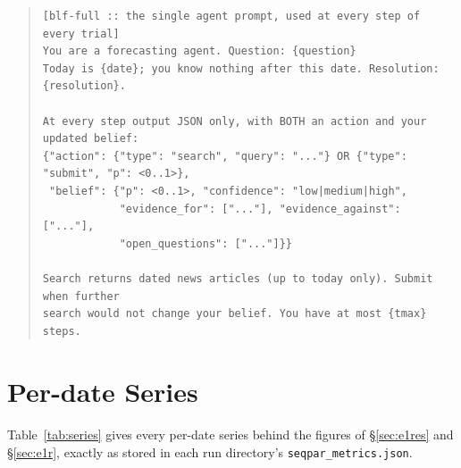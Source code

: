 \documentclass[10pt]{article}
\begin{document}
\begin{quote}
\begin{verbatim}
[blf-full :: the single agent prompt, used at every step of every trial]
You are a forecasting agent. Question: {question}
Today is {date}; you know nothing after this date. Resolution: {resolution}.

At every step output JSON only, with BOTH an action and your updated belief:
{"action": {"type": "search", "query": "..."} OR {"type": "submit", "p": <0..1>},
 "belief": {"p": <0..1>, "confidence": "low|medium|high",
            "evidence_for": ["..."], "evidence_against": ["..."],
            "open_questions": ["..."]}}

Search returns dated news articles (up to today only). Submit when further
search would not change your belief. You have at most {tmax} steps.
\end{verbatim}\end{quote}

\section{Per-date Series}\label{app:series}
Table~\ref{tab:series} gives every per-date series behind the figures of
\S\ref{sec:e1res} and \S\ref{sec:e1r}, exactly as stored in each run directory's
\texttt{seqpar\_metrics.json}.
\end{document}
